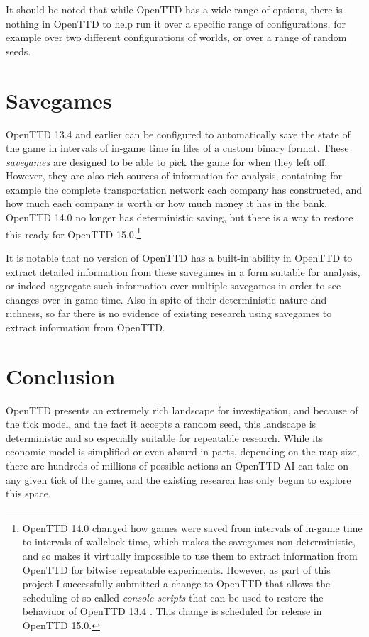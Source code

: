 \documentclass[logo,msc,dsti]{style/infthesis}    %
\begin{document}
{It should be noted that while OpenTTD has a wide range of options, there is nothing in OpenTTD to help run it over a specific range of configurations, for example over two different configurations of worlds, or over a range of random seeds.

\section{Savegames}

OpenTTD 13.4 and earlier can be configured to automatically save the state of the game in intervals of in-game time in files of a custom binary format. These \emph{savegames} are designed to be able to pick the game for when they left off. However, they are also rich sources of information for analysis, containing for example the complete transportation network each company has constructed, and how much each company is worth or how much money it has in the bank. OpenTTD 14.0 no longer has deterministic saving, but there is a way to restore this ready for OpenTTD 15.0.\footnote{OpenTTD 14.0 changed how games were saved from intervals of in-game time to intervals of wallclock time, which makes the savegames non-deterministic, and so makes it virtually impossible to use them to extract information from OpenTTD for bitwise repeatable experiments. However, as part of this project I successfully submitted a change to OpenTTD that allows the scheduling of so-called \emph{console scripts} that can be used to restore the behaviuor of OpenTTD 13.4 \cite{OpenTTDScheduleScript}. This change is scheduled for release in OpenTTD 15.0.}

It is notable that no version of OpenTTD has a built-in ability in OpenTTD to extract detailed information from these savegames in a form suitable for analysis, or indeed aggregate such information over multiple savegames in order to see changes over in-game time. Also in spite of their deterministic nature and richness, so far there is no evidence of existing research using savegames to extract information from OpenTTD.

\section{Conclusion}

OpenTTD presents an extremely rich landscape for investigation, and because of the tick model, and the fact it accepts a random seed, this landscape is deterministic and so especially suitable for repeatable research. While its economic model is simplified or even absurd in parts, depending on the map size, there are hundreds of millions of possible actions an OpenTTD AI can take on any given tick of the game, and the existing research has only begun to explore this space.

}
\end{document}
